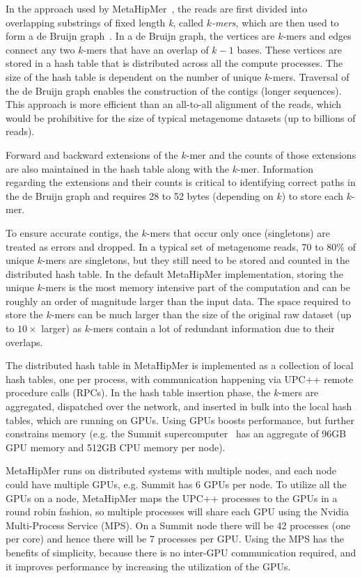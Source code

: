 In the approach used by MetaHipMer~\cite{GeorganasEHG18,HofmeyrEGC20}, the reads are first divided into overlapping
substrings of fixed length {\it k}, called {\it $k$-mers}, which are then used
to form a de Bruijn graph~\cite{CompeauPeTe11}. In a de Bruijn graph, the
vertices are $k$-mers and edges connect any two $k$-mers that have an overlap of
$k-1$ bases. These vertices are stored in a hash table that is distributed
across all the compute processes.  The size of the hash table is dependent on
the number of unique $k$-mers.  Traversal of the de Bruijn graph enables the
construction of the contigs (longer sequences).  This approach is more efficient
than an all-to-all alignment of the reads, which would be prohibitive for the
size of typical metagenome datasets (up to billions of reads).

Forward and backward extensions of the $k$-mer and the counts of those
extensions are also maintained in the hash table along with the $k$-mer.
Information regarding the extensions and their counts is critical to identifying
correct paths in the de Bruijn graph and requires 28 to 52 bytes (depending on
$k$) to store each $k$-mer.

To ensure accurate contigs, the $k$-mers that occur only once (singletons) are
treated as errors and dropped. In a typical set of metagenome reads, 70 to 80\%
of unique $k$-mers are singletons, but they still need to be stored and counted
in the distributed hash table. In the default MetaHipMer implementation, storing
the unique $k$-mers is the most memory intensive part of the computation and can
be roughly an order of magnitude larger than the input data.  The space required
to store the $k$-mers can be much larger than the size of the original raw
dataset (up to $10\times$ larger) as $k$-mers contain a lot of redundant
information due to their overlaps.

The distributed hash table in MetaHipMer is implemented as a collection of local
hash tables, one per process, with communication happening via UPC++ remote
procedure calls (RPCs). In the hash table insertion phase, the $k$-mers are
aggregated, dispatched over the network, and inserted in bulk into the local
hash tables, which are running on GPUs. Using GPUs boosts performance, but
further constrains memory (e.g. the Summit supercomputer~\cite{VazhkudaiDBG18}
has an aggregate of 96GB GPU memory and 512GB CPU memory per node).

MetaHipMer runs on distributed systems with multiple nodes, and each node could
have multiple GPUs, e.g. Summit has 6 GPUs per node. To utilize all the GPUs on
a node, MetaHipMer maps the UPC++ processes to the GPUs in a round robin
fashion, so multiple processes will share each GPU using the Nvidia
Multi-Process Service (MPS). On a Summit node there will be 42 processes (one
per core) and hence there will be 7 processes per GPU\@. Using the MPS has the
benefits of simplicity, because there is no inter-GPU communication required,
and it improves performance by increasing the utilization of the GPUs.

